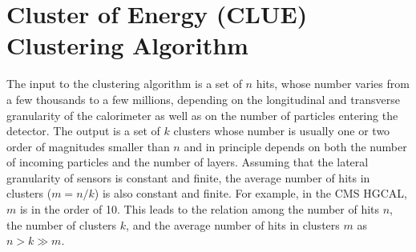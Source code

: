 
\section{Cluster of Energy (CLUE) Clustering Algorithm}
\label{sec:clue}







The input to the clustering algorithm is a set of $n$ hits, whose number varies from a few thousands to a few millions, depending on the longitudinal and transverse granularity of the calorimeter as well as on the number of particles entering the detector. The output is a set of $k$ clusters whose number is usually one or two order of magnitudes smaller than $n$ and in principle depends on both the number of incoming particles and the number of layers. Assuming that the lateral granularity of sensors is constant and finite, the average number of hits in clusters ($m=n/k$) is also constant and finite. For example, in the CMS HGCAL, $m$ is in the order of 10. This leads to the relation among the number of hits $n$, the number of clusters $k$, and the average number of hits in clusters $m$ as $n > k \gg m$.



